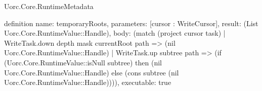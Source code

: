 \begin{lexlean}{Uorc.Core.RuntimeMetadata}
\begin{semanticmodule}
definition{
  name: temporaryRoots,
  parameters: [cursor : WriteCursor],
  result: (List Uorc.Core.RuntimeValue::Handle),
  body: (match (project cursor task)
    | WriteTask.down depth mask currentRoot path => (nil Uorc.Core.RuntimeValue::Handle)
    | WriteTask.up subtree path => (if (Uorc.Core.RuntimeValue::isNull subtree) then (nil Uorc.Core.RuntimeValue::Handle) else (cons subtree (nil Uorc.Core.RuntimeValue::Handle)))),
  executable: true
}
\end{semanticmodule}
\end{lexlean}
